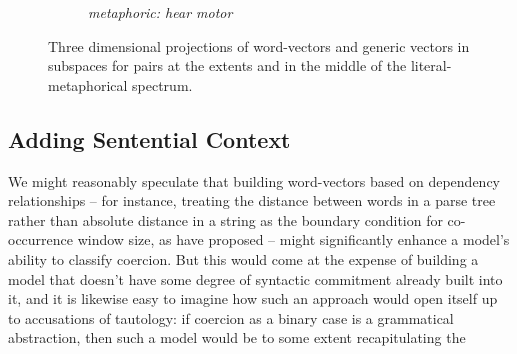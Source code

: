 \begin{figure}
\begin{subfigure}{0.3\textwidth}
\caption*{\footnotesize \emph{metaphoric: hear motor}}
\end{subfigure}
\caption{Three dimensional projections of word-vectors and generic vectors in subspaces for pairs at the extents and in the middle of the literal-metaphorical spectrum.}
\label{fig:relsimspaces}
\end{figure}

\subsection{Adding Sentential Context}
We might reasonably speculate that building word-vectors based on dependency relationships -- for instance, treating the distance between words in a parse tree rather than absolute distance in a string as the boundary condition for co-occurrence window size, as \cite{WHO} have proposed -- might significantly enhance a model's ability to classify coercion.  But this would come at the expense of building a model that doesn't have some degree of syntactic commitment already built into it, and it is likewise easy to imagine how such an approach would open itself up to accusations of tautology: if coercion as a binary case is a grammatical abstraction, then such a model would be to some extent recapitulating the 

